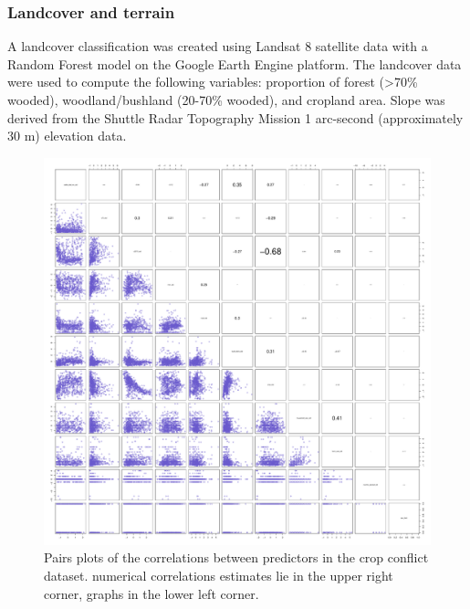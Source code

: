 \documentclass[12pt,]{article}
\begin{document}
\subsubsection*{Landcover and terrain}
A landcover classification was created using Landsat 8 satellite data with a Random Forest model on the Google Earth Engine platform. The landcover data were used to compute the following variables: proportion of forest (>70\% wooded), woodland/bushland (20-70\% wooded), and cropland area. Slope was derived from the Shuttle Radar Topography Mission \citep{farr2007shuttle} 1 arc-second (approximately 30 m) elevation data.

\begin{figure}
    \centering
    \includegraphics[width=\textwidth]{Figures/pairs_plot_crop_conflict.pdf}
    \caption{Pairs plots of the correlations between predictors in the crop conflict dataset. numerical correlations estimates lie in the upper right corner, graphs in the lower left corner.}
    \label{fig:pairsplotcrop}
\end{figure}
\end{document}
